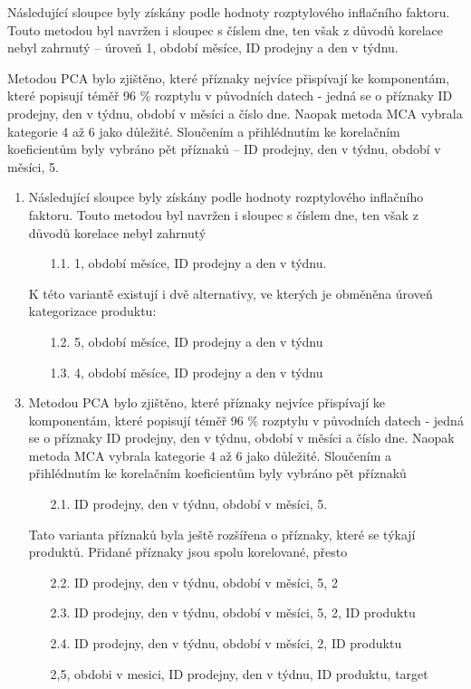 Následující sloupce byly získány podle hodnoty rozptylového inflačního faktoru. Touto metodou byl navržen i sloupec s číslem dne, ten však z důvodů korelace nebyl zahrnutý -- úroveň 1, období měsíce, ID prodejny a den v týdnu.
    
Metodou PCA bylo zjištěno, které příznaky nejvíce přispívají ke komponentám, které popisují téměř 96 \% rozptylu v původních datech - jedná se o příznaky ID prodejny, den v týdnu, období v měsíci a číslo dne. 
Naopak metoda MCA vybrala kategorie 4 až 6 jako důležité. Sloučením a přihlédnutím ke korelačním koeficientům byly vybráno pět příznaků -- 
    ID prodejny, den v týdnu, období v měsíci, 5.

\begin{enumerate}
    \item Následující sloupce byly získány podle hodnoty rozptylového inflačního faktoru. Touto metodou byl navržen i sloupec s číslem dne, ten však z důvodů korelace nebyl zahrnutý
    \begin{enumerate}
        \item[1.1.] 1, období měsíce, ID prodejny a den v týdnu.
    \end{enumerate}
    
    \item[] K této variantě existují i dvě alternativy, ve kterých je obměněna úroveň kategorizace produktu:     
    \begin{enumerate}
    \item[1.2.] 5, období měsíce, ID prodejny a den v týdnu
    \item[1.3.] 4, období měsíce, ID prodejny a den v týdnu
    \end{enumerate}
    \item Metodou PCA bylo zjištěno, které příznaky nejvíce přispívají ke komponentám, které popisují téměř 96 \% rozptylu v původních datech - jedná se o příznaky ID prodejny, den v týdnu, období v měsíci a číslo dne. Naopak metoda MCA vybrala kategorie 4 až 6 jako důležité. Sloučením a přihlédnutím ke korelačním koeficientům byly vybráno pět příznaků
    \begin{enumerate}
        \item[2.1.] ID prodejny, den v týdnu, období v měsíci, 5.
    \end{enumerate}
    \item[] Tato varianta příznaků byla ještě rozšířena o příznaky, které se týkají produktů. Přidané příznaky jsou spolu korelované, přesto 
    \begin{enumerate}
    \item[2.2.] ID prodejny, den v týdnu, období v měsíci, 5, 2
    \item[2.3.] ID prodejny, den v týdnu, období v měsíci, 5, 2, ID produktu
    \item[2.4.] ID prodejny, den v týdnu, období v měsíci, 2, ID produktu
    \item[] 2,5, obdobi v mesici,  ID prodejny, den v týdnu, ID produktu, target
    \end{enumerate}
\end{enumerate}

